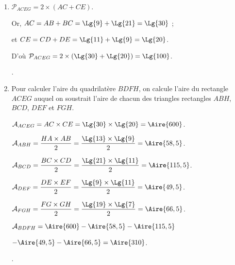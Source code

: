 \begin{Maquette}[Fiche,CorrigeFin,Colonnes=2]{}
\begin{multicols}{2}
         \begin{Solution}
            \begin{enumerate}
               \item $\mathcal{P}_{ACEG} =2\times(AC+CE)$. \par
                  Or, $AC =AB+BC =\Lg{9}+\Lg{21} =\Lg{30}$ ;\par
                  et $CE =CD+DE =\Lg{11}+\Lg{9} =\Lg{20}$. \par
                  D'où $\mathcal{P}_{ACEG} =2\times(\Lg{30}+\Lg{20}) =\Lg{100}$. \par
                  .
               \item Pour calculer l'aire du quadrilatère $BDFH$, on calcule l'aire du rectangle $ACEG$ auquel on soustrait l'aire de chacun des triangles rectangles $ABH$, $BCD$, $DEF$ et $FGH$. \par
                  $\mathcal{A}_{ACEG} =AC\times CE =\Lg{30}\times\Lg{20} =\Aire{600}$. \par \smallskip
                  $\mathcal{A}_{ABH} =\dfrac{HA\times AB}{2} =\dfrac{\Lg{13}\times\Lg{9}}{2} =\Aire{58,5}$. \par
                  $\mathcal{A}_{BCD} =\dfrac{BC\times CD}{2} =\dfrac{\Lg{21}\times\Lg{11}}{2} =\Aire{115,5}$. \par
                  $\mathcal{A}_{DEF} =\dfrac{DE\times EF}{2} =\dfrac{\Lg{9}\times\Lg{11}}{2} =\Aire{49,5}$. \par
                  $\mathcal{A}_{FGH} = \dfrac{FG\times GH}{2} =\dfrac{\Lg{19}\times\Lg{7}}{2} =\Aire{66,5}$. \par
                  $\mathcal{A}_{BDFH} =\Aire{600}-\Aire{58,5}-\Aire{115,5}$ \par
                  \hspace*{15mm} $-\Aire{49,5}-\Aire{66,5} =\Aire{310}$. \par
                  .
            \end{enumerate}
         \end{Solution}

   \end{multicols}

\end{Maquette}


